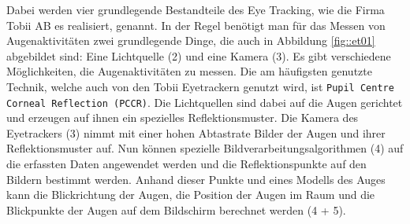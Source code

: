 Dabei werden vier grundlegende Bestandteile des Eye Tracking, wie die Firma Tobii AB es realisiert, genannt.
In der Regel benötigt man für das Messen von Augenaktivitäten zwei grundlegende Dinge, die auch in Abbildung \ref{fig::et01} abgebildet sind: Eine Lichtquelle (2) und eine Kamera (3).
Es gibt verschiedene Möglichkeiten, die Augenaktivitäten zu messen.
Die am häufigsten genutzte Technik, welche auch von den Tobii Eyetrackern genutzt wird, ist \texttt{Pupil Centre Corneal Reflection (PCCR)}.
Die Lichtquellen sind dabei auf die Augen gerichtet und erzeugen auf ihnen ein spezielles Reflektionsmuster.
Die Kamera des Eyetrackers (3) nimmt mit einer hohen Abtastrate Bilder der Augen und ihrer Reflektionsmuster auf.
Nun können spezielle Bildverarbeitungsalgorithmen (4) auf die erfassten Daten angewendet werden und die Reflektionspunkte auf den Bildern bestimmt werden.
Anhand dieser Punkte und eines Modells des Auges kann die Blickrichtung der Augen, die Position der Augen im Raum und die Blickpunkte der Augen auf dem Bildschirm berechnet werden (4 + 5).

